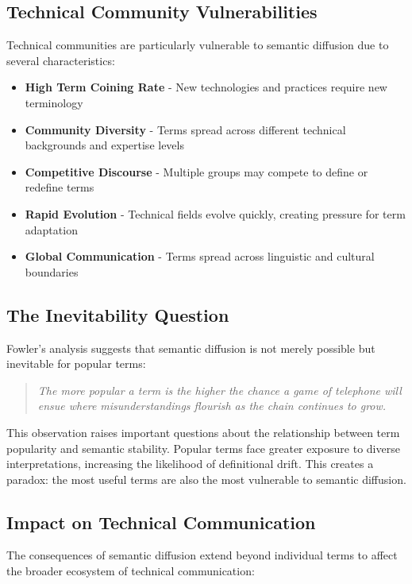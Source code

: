 \documentclass[11pt]{article}
\begin{document}
\subsection{Technical Community Vulnerabilities}

Technical communities are particularly vulnerable to semantic diffusion due to several characteristics:

\begin{itemize}
\item \textbf{High Term Coining Rate} - New technologies and practices require new terminology
\item \textbf{Community Diversity} - Terms spread across different technical backgrounds and expertise levels
\item \textbf{Competitive Discourse} - Multiple groups may compete to define or redefine terms
\item \textbf{Rapid Evolution} - Technical fields evolve quickly, creating pressure for term adaptation
\item \textbf{Global Communication} - Terms spread across linguistic and cultural boundaries
\end{itemize}

\subsection{The Inevitability Question}

Fowler's analysis suggests that semantic diffusion is not merely possible but inevitable for popular terms:

\begin{quote}
\emph{The more popular a term is the higher the chance a game of telephone will ensue where misunderstandings flourish as the chain continues to grow.}
\end{quote}

This observation raises important questions about the relationship between term popularity and semantic stability. Popular terms face greater exposure to diverse interpretations, increasing the likelihood of definitional drift. This creates a paradox: the most useful terms are also the most vulnerable to semantic diffusion.

\subsection{Impact on Technical Communication}

The consequences of semantic diffusion extend beyond individual terms to affect the broader ecosystem of technical communication:
\end{document}
